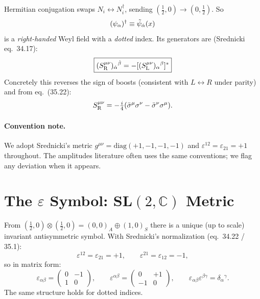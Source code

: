 Hermitian conjugation swaps $N_i \leftrightarrow N_i^\dagger$, sending
$(\tfrac{1}{2},0) \to (0,\tfrac{1}{2})$.  So
\begin{equation}
  (\psi_\alpha)^\dagger \equiv \tilde\psi_{\dot{\alpha}}(x)
\end{equation}
is a \emph{right-handed} Weyl field with a \emph{dotted} index.
Its generators are (Srednicki eq.~34.17):
\begin{equation}
  \boxed{
    (S^{\mu\nu}_{\mathrm{R}})_{\dot{\alpha}}{}^{\dot{\beta}} = -[(S^{\mu\nu}_{\mathrm{L}})_\alpha{}^\beta]^*
  }
\end{equation}
Concretely this reverses the sign of boosts (consistent with
$L \leftrightarrow R$ under parity) and from eq.~(35.22):
\begin{equation}
  S^{\mu\nu}_{\mathrm{R}}
  = -\tfrac{i}{4}(\bar{\sigma}^\mu\sigma^\nu - \bar{\sigma}^\nu\sigma^\mu).
\end{equation}

\paragraph{Convention note.}
We adopt Srednicki's metric $g^{\mu\nu} = \mathrm{diag}(+1,-1,-1,-1)$
and $\varepsilon^{12} = \varepsilon_{21} = +1$ throughout.
The amplitudes literature often uses the same conventions; we flag any
deviation when it appears.

\section{The \texorpdfstring{$\varepsilon$}{epsilon} Symbol:
  SL\texorpdfstring{$(2,\mathbb{C})$}{(2,C)} Metric}

From $({\tfrac12},0)\otimes({\tfrac12},0) = (0,0)_A\oplus(1,0)_S$
there is a unique (up to scale) invariant antisymmetric symbol.
With Srednicki's normalization (eq.~34.22 / 35.1):
\begin{equation}
  \varepsilon^{12} = \varepsilon_{21} = +1, \qquad
  \varepsilon^{21} = \varepsilon_{12} = -1,
\end{equation}
so in matrix form:
\begin{equation}
  \varepsilon_{\alpha\beta} = \begin{pmatrix}0&-1\\1&0\end{pmatrix}, \qquad
  \varepsilon^{\alpha\beta} = \begin{pmatrix}0&+1\\-1&0\end{pmatrix}, \qquad
  \varepsilon_{\alpha\beta}\varepsilon^{\beta\gamma} = \delta_\alpha{}^\gamma.
\end{equation}
The same structure holds for dotted indices.

